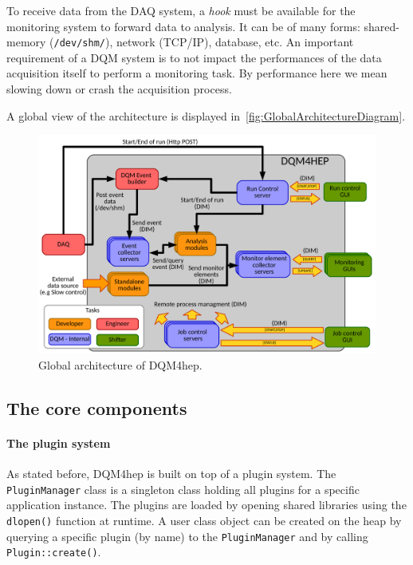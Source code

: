 \documentclass{webofc}
\begin{document}
To receive data from the DAQ system, a \textit{hook} must be available for the monitoring system to forward data to analysis. It can be of many forms: shared-memory (\texttt{/dev/shm/}), network (TCP/IP), database, etc. An important requirement of a DQM system is to not impact the performances of the data acquisition itself to perform a monitoring task. By performance here we mean slowing down or crash the acquisition process.

A global view of the architecture is displayed in~\autoref{fig:GlobalArchitectureDiagram}.

\begin{figure}
  \centering
  \includegraphics[width=.95\textwidth]{figs/GlobalArchitectureDiagram.pdf}
  \caption{Global architecture of DQM4hep.}
  \label{fig:GlobalArchitectureDiagram}
\end{figure}

\subsection{The core components}
\label{subsec:core}

\paragraph{The plugin system}

As stated before, DQM4hep is built on top of a plugin system. The \texttt{PluginManager} class is a singleton class holding all plugins for a specific application instance. The plugins are loaded by opening shared libraries using the \texttt{dlopen()} function at runtime. A user class object can be created on the heap by querying a specific plugin (by name) to the \texttt{PluginManager} and by calling \texttt{Plugin::create()}.
\end{document}
